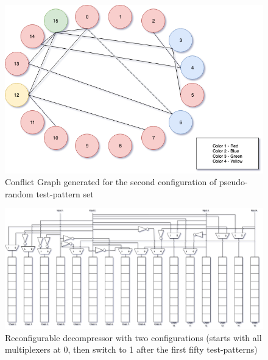 \documentclass[letterpaper]{article} %
\begin{document}
\begin{figure}[ht]
	\centering
	\includegraphics[width=12.0cm]{conf2.png}
	\caption{Conflict Graph generated for the second configuration of pseudo-random test-pattern set}
\end{figure}

\newpage

\begin{figure}[ht]
	\centering
	\includegraphics[width=16.0cm]{reconfig.png}
	\caption{Reconfigurable decompressor with two configurations (starts with all multiplexers at 0, then switch to 1 after the first fifty test-patterns)}
\end{figure}
\end{document}
